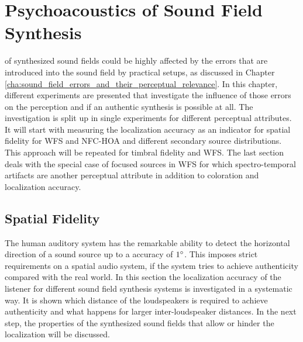 \def \GITHUB {\GITHUBBASE/05_psychoacoustics}
\graphicspath{%
{\PATH/\CHAPFIVE/fig5_01/}%
{\PATH/\CHAPFIVE/fig5_02/}%
{\PATH/\CHAPFIVE/fig5_03/}%
{\PATH/\CHAPFIVE/fig5_04/}%
{\PATH/\CHAPFIVE/fig5_05/}%
{\PATH/\CHAPFIVE/fig5_06/}%
{\PATH/\CHAPFIVE/fig5_07/}%
{\PATH/\CHAPFIVE/fig5_08/}%
{\PATH/\CHAPFIVE/fig5_09/}%
{\PATH/\CHAPFIVE/fig5_10/}%
{\PATH/\CHAPFIVE/fig5_11/}%
{\PATH/\CHAPFIVE/fig5_12/}%
{\PATH/\CHAPFIVE/fig5_13/}%
{\PATH/\CHAPFIVE/fig5_14/}%
{\PATH/\CHAPFIVE/fig5_15/}%
{\PATH/\CHAPFIVE/fig5_16/}%
{\PATH/\CHAPFIVE/fig5_17/}%
}


\chapter{Psychoacoustics of Sound Field Synthesis}
\label{cha:psychoacoustics}

 of synthesized sound fields could be highly
affected by the errors that are introduced into the sound
field by practical setups, as discussed in
Chapter\,\ref{cha:sound_field_errors_and_their_perceptual_relevance}.
In this chapter, different experiments are presented that investigate
the influence of those errors on the perception and if an
authentic synthesis is possible at all. The investigation is split up in
single experiments for different perceptual attributes.
It will start with measuring the localization
accuracy as an indicator for spatial fidelity for \ac{WFS} and \ac{NFC-HOA} and
different secondary source distributions. This approach will be repeated for timbral
fidelity and \ac{WFS}.
The last section deals with the special case of focused sources in \ac{WFS} for
which spectro-temporal artifacts are another perceptual attribute in addition to
coloration and localization accuracy.


\section[Spatial Fidelity]{Spatial Fidelity\autocite[Parts of this section are published
in][]{Wierstorf2012c,Wierstorf2013}}
\label{sec:localization}

The human auditory system has the remarkable ability to detect the horizontal
direction of a sound source up to a accuracy of $1^\circ$. This imposes strict
requirements on a spatial audio system, if the system tries to achieve
authenticity
compared with the real world. In this section the localization accuracy of the
listener for different sound field synthesis systems is investigated in a
systematic way. It is shown which distance of the loudspeakers is required to
achieve authenticity and what happens for larger inter-loudspeaker
distances. In the next step, the properties of the
synthesized sound fields that allow or hinder the localization will be discussed.

